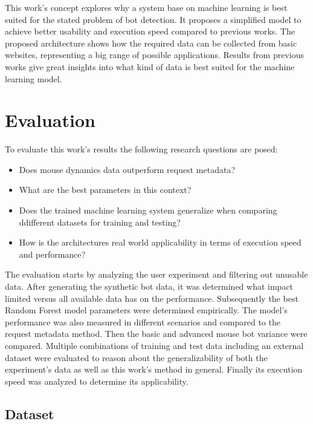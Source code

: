 \documentclass[
    fontsize=12pt,
    headings=small,
    parskip=half,           %
    bibliography=totoc,
    numbers=noenddot,       %
    open=any,               %
    final,                   %
    table
]{scrreprt}
\begin{document}
This work's concept explores why a system base on machine learning is best suited for the stated problem of bot detection. It proposes a simplified model to achieve better usability and execution speed compared to previous works. The proposed architecture shows how the required data can be collected from basic websites, representing a big range of possible applications. Results from previous works give great insights into what kind of data is best suited for the machine learning model.


\chapter{Evaluation}

To evaluate this work's results the following research questions are posed:

\begin{itemize}
    \item Does mouse dynamics data outperform request metadata?
    \item What are the best parameters in this context?
    \item Does the trained machine learning system generalize when comparing ddifferent datasets for training and testing?
    \item How is the architectures real world applicability in terms of execution speed and performance?

\end{itemize}

The evaluation starts by analyzing the user experiment and filtering out unusable data. After generating the synthetic bot data, it was determined what impact limited versus all available data has on the performance. Subsequently the best Random Forest model parameters were determined empirically. The model's performance was also measured in different scenarios and compared to the request metadata method. Then the basic and advanced mouse bot variance were compared. Multiple combinations of training and test data including an external dataset were evaluated to reason about the generalizability of both the experiment's data as well as this work's method in general. Finally its execution speed was analyzed to determine its applicability.

\section{Dataset}
\end{document}
